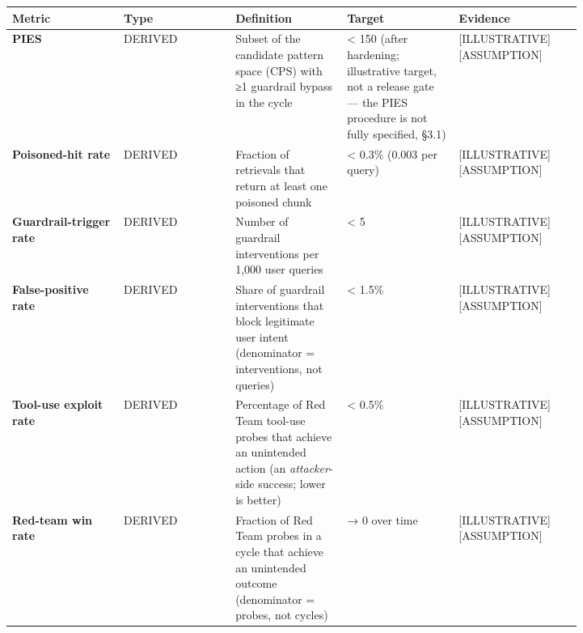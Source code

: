 \nopagebreak[4]
\begin{longtable}[]{@{}
  >{\raggedright\arraybackslash}p{0.1647\linewidth}
  >{\raggedright\arraybackslash}p{0.1647\linewidth}
  >{\raggedright\arraybackslash}p{0.1647\linewidth}
  >{\raggedright\arraybackslash}p{0.1647\linewidth}
  >{\raggedright\arraybackslash}p{0.1647\linewidth}@{}}
\toprule\noalign{}
\begin{minipage}[b]{\linewidth}\raggedright
Metric
\end{minipage} & \begin{minipage}[b]{\linewidth}\raggedright
Type
\end{minipage} & \begin{minipage}[b]{\linewidth}\raggedright
Definition
\end{minipage} & \begin{minipage}[b]{\linewidth}\raggedright
Target
\end{minipage} & \begin{minipage}[b]{\linewidth}\raggedright
Evidence
\end{minipage} \\
\midrule\noalign{}
\endhead
\bottomrule\noalign{}
\endlastfoot
\textbf{PIES} & DERIVED & Subset of the candidate pattern space (CPS)
with ≥1 guardrail bypass in the cycle & \textless{} 150 (after
hardening; illustrative target, not a release gate --- the PIES
procedure is not fully specified, §3.1) &
\mbox{{[}ILLUSTRATIVE{]}}\hspace{0pt}\mbox{{[}ASSUMPTION{]}} \\
\noalign{\label{tab:24.3}}
\textbf{Poisoned-hit rate} & DERIVED & Fraction of retrievals that
return at least one poisoned chunk & \textless{} 0.3\% (0.003 per query)
& \mbox{{[}ILLUSTRATIVE{]}}\hspace{0pt}\mbox{{[}ASSUMPTION{]}} \\
\textbf{Guardrail-trigger rate} & DERIVED & Number of guardrail
interventions per 1,000 user queries & \textless{} 5 &
\mbox{{[}ILLUSTRATIVE{]}}\hspace{0pt}\mbox{{[}ASSUMPTION{]}} \\
\textbf{False-positive rate} & DERIVED & Share of guardrail
interventions that block legitimate user intent (denominator =
interventions, not queries) & \textless{} 1.5\% &
\mbox{{[}ILLUSTRATIVE{]}}\hspace{0pt}\mbox{{[}ASSUMPTION{]}} \\
\textbf{Tool-use exploit rate} & DERIVED & Percentage of Red Team
tool-use probes that achieve an unintended action (an
\emph{attacker}-side success; lower is better) & \textless{} 0.5\% &
\mbox{{[}ILLUSTRATIVE{]}}\hspace{0pt}\mbox{{[}ASSUMPTION{]}} \\
\textbf{Red-team win rate} & DERIVED & Fraction of Red Team probes in a
cycle that achieve an unintended outcome (denominator = probes, not
cycles) & → 0 over time & \mbox{{[}ILLUSTRATIVE{]}}\hspace{0pt}\mbox{{[}ASSUMPTION{]}} \\
\end{longtable}


